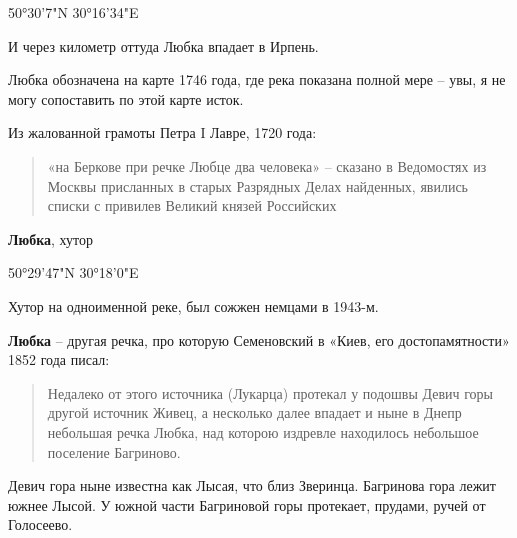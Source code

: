 50°30'7"N 30°16'34"E

И через километр оттуда Любка впадает в Ирпень.

Любка обозначена на карте 1746 года, где река показана полной мере – увы, я не могу сопоставить по этой карте исток. 


Из жалованной грамоты Петра I Лавре, 1720 года:

\begin{quotation}
«на Беркове при речке Любце два человека» – сказано в Ведомостях из Москвы присланных в старых Разрядных Делах найденных, явились списки с привилев Великий князей Российских
\end{quotation} 

\medskip


\textbf{Любка}, хутор

50°29'47"N 30°18'0"E

Хутор на одноименной реке, был сожжен немцами в 1943-м.\\

\medskip

\textbf{Любка} – другая речка, про которую Семеновский в «Киев, его достопамятности» 1852 года писал:

\begin{quotation}
Недалеко от этого источника (Лукарца) протекал у подошвы Девич горы другой источник Живец, а несколько далее впадает и ныне в Днепр не\-большая речка Любка, над которою издревле находилось небольшое поселение Багриново.
\end{quotation}

Девич гора ныне известна как Лысая, что близ Зверинца. Багринова гора лежит южнее Лысой. У южной части Багриновой горы протекает, прудами, ручей от Голосеево.



